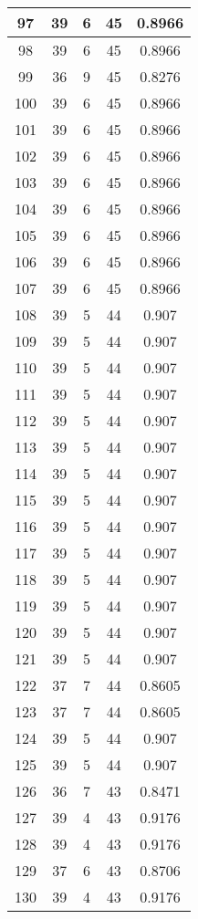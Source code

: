 \documentclass[letterpaper, 12pt]{article}
\begin{document}
\begin{longtable}{|c|c|c|c|c|}
\hline
97 & 39 & 6 & 45 & 0.8966 \\
\hline
98 & 39 & 6 & 45 & 0.8966 \\
\hline
99 & 36 & 9 & 45 & 0.8276 \\
\hline
100 & 39 & 6 & 45 & 0.8966 \\
\hline
101 & 39 & 6 & 45 & 0.8966 \\
\hline
102 & 39 & 6 & 45 & 0.8966 \\
\hline
103 & 39 & 6 & 45 & 0.8966 \\
\hline
104 & 39 & 6 & 45 & 0.8966 \\
\hline
105 & 39 & 6 & 45 & 0.8966 \\
\hline
106 & 39 & 6 & 45 & 0.8966 \\
\hline
107 & 39 & 6 & 45 & 0.8966 \\
\hline
108 & 39 & 5 & 44 & 0.907 \\
\hline
109 & 39 & 5 & 44 & 0.907 \\
\hline
110 & 39 & 5 & 44 & 0.907 \\
\hline
111 & 39 & 5 & 44 & 0.907 \\
\hline
112 & 39 & 5 & 44 & 0.907 \\
\hline
113 & 39 & 5 & 44 & 0.907 \\
\hline
114 & 39 & 5 & 44 & 0.907 \\
\hline
115 & 39 & 5 & 44 & 0.907 \\
\hline
116 & 39 & 5 & 44 & 0.907 \\
\hline
117 & 39 & 5 & 44 & 0.907 \\
\hline
118 & 39 & 5 & 44 & 0.907 \\
\hline
119 & 39 & 5 & 44 & 0.907 \\
\hline
120 & 39 & 5 & 44 & 0.907 \\
\hline
121 & 39 & 5 & 44 & 0.907 \\
\hline
122 & 37 & 7 & 44 & 0.8605 \\
\hline
123 & 37 & 7 & 44 & 0.8605 \\
\hline
124 & 39 & 5 & 44 & 0.907 \\
\hline
125 & 39 & 5 & 44 & 0.907 \\
\hline
126 & 36 & 7 & 43 & 0.8471 \\
\hline
127 & 39 & 4 & 43 & 0.9176 \\
\hline
128 & 39 & 4 & 43 & 0.9176 \\
\hline
129 & 37 & 6 & 43 & 0.8706 \\
\hline
130 & 39 & 4 & 43 & 0.9176 \\
\hline

\end{longtable}
\end{document}
